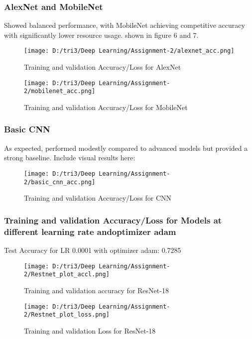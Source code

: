 \documentclass[10pt,twocolumn,letterpaper]{article}
\begin{document}
\subsubsection{AlexNet and MobileNet} Showed balanced performance, with MobileNet achieving competitive accuracy with significantly lower resource usage. shown in figure 6 and 7.

\begin{figure}[H]
    \centering
    \texttt{[image: D:/tri3/Deep Learning/Assignment-2/alexnet\_acc.png]}
    \caption{Training and validation Accuracy/Loss for AlexNet }
    \label{fig1: Implementation of AlexNet}
\end{figure}
\begin{figure}[H]
    \centering
    \texttt{[image: D:/tri3/Deep Learning/Assignment-2/mobilenet\_acc.png]}
    \caption{Training and validation Accuracy/Loss for MobileNet }
    \label{fig1: Implementation of AlexNet}
\end{figure}
\subsubsection{Basic CNN} As expected, performed modestly compared to advanced models but provided a strong baseline. Include visual results here: 

\begin{figure}[H]
    \centering
    \texttt{[image: D:/tri3/Deep Learning/Assignment-2/basic\_cnn\_acc.png]}
    \caption{Training and validation Accuracy/Loss for CNN }
    \label{fig1: Implementation of AlexNet}
\end{figure}

\subsubsection{Training and validation Accuracy/Loss for Models at different learning rate andoptimizer adam}
Test Accuracy for LR 0.0001 with optimizer adam: 0.7285
\begin{figure}[H]
    \centering
    \texttt{[image: D:/tri3/Deep Learning/Assignment-2/Restnet\_plot\_accl.png]}
    \caption{Training and validation accuracy for ResNet-18}
    \label{fig1: Implementation of AlexNet}
\end{figure}
\begin{figure}[H]
    \centering
    \texttt{[image: D:/tri3/Deep Learning/Assignment-2/Restnet\_plot\_loss.png]}
    \caption{Training and validation Loss for ResNet-18}
    \label{fig1: Implementation of AlexNet}
\end{figure}
\end{document}
